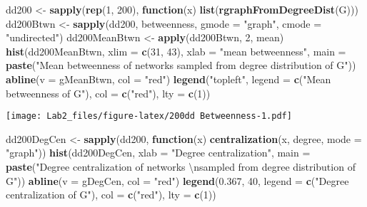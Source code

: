 \documentclass[]{article}
\newenvironment{Shaded}{\begin{snugshade}}{\end{snugshade}}
\newcommand{\KeywordTok}[1]{\textcolor[rgb]{0.13,0.29,0.53}{\textbf{#1}}}
\newcommand{\DataTypeTok}[1]{\textcolor[rgb]{0.13,0.29,0.53}{#1}}
\newcommand{\DecValTok}[1]{\textcolor[rgb]{0.00,0.00,0.81}{#1}}
\newcommand{\FloatTok}[1]{\textcolor[rgb]{0.00,0.00,0.81}{#1}}
\newcommand{\CharTok}[1]{\textcolor[rgb]{0.31,0.60,0.02}{#1}}
\newcommand{\StringTok}[1]{\textcolor[rgb]{0.31,0.60,0.02}{#1}}
\newcommand{\ControlFlowTok}[1]{\textcolor[rgb]{0.13,0.29,0.53}{\textbf{#1}}}
\newcommand{\NormalTok}[1]{#1}
\begin{document}
\begin{Shaded}
\begin{Highlighting}[]
\NormalTok{dd200 <-}\StringTok{ }\KeywordTok{sapply}\NormalTok{(}\KeywordTok{rep}\NormalTok{(}\DecValTok{1}\NormalTok{, }\DecValTok{200}\NormalTok{), }\ControlFlowTok{function}\NormalTok{(x) }\KeywordTok{list}\NormalTok{(}\KeywordTok{rgraphFromDegreeDist}\NormalTok{(G)))}
\NormalTok{dd200Btwn <-}\StringTok{ }\KeywordTok{sapply}\NormalTok{(dd200, betweenness, }\DataTypeTok{gmode =} \StringTok{"graph"}\NormalTok{, }\DataTypeTok{cmode =} \StringTok{"undirected"}\NormalTok{)}
\NormalTok{dd200MeanBtwn <-}\StringTok{ }\KeywordTok{apply}\NormalTok{(dd200Btwn, }\DecValTok{2}\NormalTok{, mean)}
\KeywordTok{hist}\NormalTok{(dd200MeanBtwn, }\DataTypeTok{xlim =} \KeywordTok{c}\NormalTok{(}\DecValTok{31}\NormalTok{, }\DecValTok{43}\NormalTok{), }\DataTypeTok{xlab =} \StringTok{"mean betweenness"}\NormalTok{,}
     \DataTypeTok{main =} \KeywordTok{paste}\NormalTok{(}\StringTok{"Mean betweenness of networks sampled from degree distribution of G"}\NormalTok{))}
\KeywordTok{abline}\NormalTok{(}\DataTypeTok{v =}\NormalTok{ gMeanBtwn, }\DataTypeTok{col =} \StringTok{"red"}\NormalTok{)}
\KeywordTok{legend}\NormalTok{(}\StringTok{"topleft"}\NormalTok{, }\DataTypeTok{legend =} \KeywordTok{c}\NormalTok{(}\StringTok{"Mean betweenness of G"}\NormalTok{), }\DataTypeTok{col =} \KeywordTok{c}\NormalTok{(}\StringTok{"red"}\NormalTok{), }\DataTypeTok{lty =} \KeywordTok{c}\NormalTok{(}\DecValTok{1}\NormalTok{))}
\end{Highlighting}
\end{Shaded}

\texttt{[image: Lab2\_files/figure-latex/200dd Betweenness-1.pdf]}

\begin{Shaded}
\begin{Highlighting}[]
\NormalTok{dd200DegCen <-}\StringTok{ }\KeywordTok{sapply}\NormalTok{(dd200, }\ControlFlowTok{function}\NormalTok{(x) }\KeywordTok{centralization}\NormalTok{(x, degree, }\DataTypeTok{mode =} \StringTok{"graph"}\NormalTok{))}
\KeywordTok{hist}\NormalTok{(dd200DegCen, }\DataTypeTok{xlab =} \StringTok{"Degree centralization"}\NormalTok{,}
     \DataTypeTok{main =} \KeywordTok{paste}\NormalTok{(}\StringTok{"Degree centralization of networks }\CharTok{\textbackslash{}n}\StringTok{sampled from degree distribution of G"}\NormalTok{))}
\KeywordTok{abline}\NormalTok{(}\DataTypeTok{v =}\NormalTok{ gDegCen, }\DataTypeTok{col =} \StringTok{"red"}\NormalTok{)}
\KeywordTok{legend}\NormalTok{(}\FloatTok{0.367}\NormalTok{, }\DecValTok{40}\NormalTok{, }\DataTypeTok{legend =} \KeywordTok{c}\NormalTok{(}\StringTok{"Degree centralization of G"}\NormalTok{), }\DataTypeTok{col =} \KeywordTok{c}\NormalTok{(}\StringTok{"red"}\NormalTok{), }\DataTypeTok{lty =} \KeywordTok{c}\NormalTok{(}\DecValTok{1}\NormalTok{))}
\end{Highlighting}
\end{Shaded}
\end{document}
